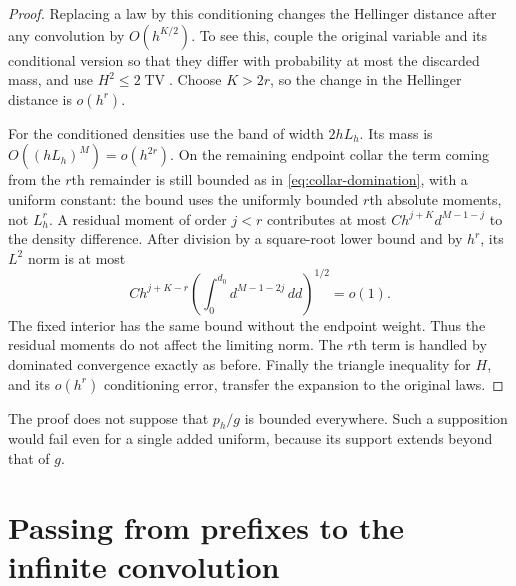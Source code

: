\documentclass[11pt,a4paper]{article}
\numberwithin{equation}{section}
\theoremstyle{definition}
\theoremstyle{remark}
\DeclareMathOperator{\TV}{TV}
\begin{document}
\begin{proof}
Replacing a law by this conditioning changes the Hellinger distance after
any convolution by $O(h^{K/2})$. To see this, couple the original variable
and its conditional version so that they differ with probability at most
the discarded mass, and use $H^2\le2\TV$. Choose $K>2r$, so the change
in the Hellinger distance is $o(h^r)$.

For the conditioned densities use the band of width $2hL_h$. Its mass is
$O((hL_h)^M)=o(h^{2r})$. On the remaining endpoint collar the term coming
from the $r$th remainder is still bounded as in
\eqref{eq:collar-domination}, with a uniform constant: the bound uses the
uniformly bounded $r$th absolute moments, not $L_h^r$. A residual moment
of order $j<r$ contributes at most
$C h^{j+K}d^{M-1-j}$ to the density difference. After division by a
square-root lower bound and by $h^r$, its $L^2$ norm is at most
\[
 C h^{j+K-r}
 \left(\int_0^{d_0}d^{M-1-2j}\,dd\right)^{1/2}=o(1).
\]
The fixed interior has the same bound without the endpoint weight. Thus the
residual moments do not affect the limiting norm. The $r$th term is handled
by dominated convergence exactly as before. Finally the triangle inequality
for $H$, and its $o(h^r)$ conditioning error, transfer the expansion to the
original laws.
\end{proof}

The proof does not suppose that $p_h/g$ is bounded everywhere. Such a
supposition would fail even for a single added uniform, because its support
extends beyond that of $g$.

\section{Passing from prefixes to the infinite convolution}
\label{sec:infinite}
\end{document}
